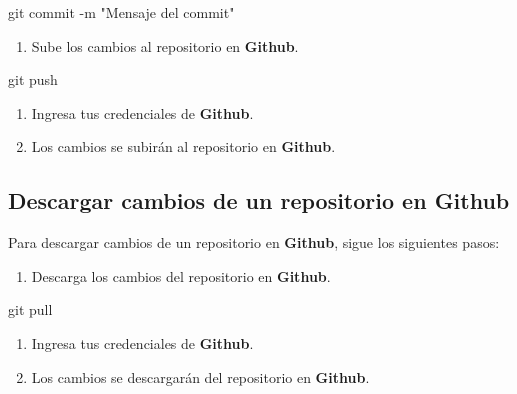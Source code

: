 \documentclass[
  a4paper,
  DIV=11,
  numbers=noendperiod,
  onepage,
  openany]{scrreprt}
\newenvironment{Shaded}{\begin{snugshade}}{\end{snugshade}}
\newcommand{\AttributeTok}[1]{\textcolor[rgb]{0.40,0.45,0.13}{#1}}
\newcommand{\FunctionTok}[1]{\textcolor[rgb]{0.28,0.35,0.67}{#1}}
\newcommand{\NormalTok}[1]{\textcolor[rgb]{0.00,0.23,0.31}{#1}}
\newcommand{\StringTok}[1]{\textcolor[rgb]{0.13,0.47,0.30}{#1}}
\providecommand{\tightlist}{%
  \setlength{\itemsep}{0pt}\setlength{\parskip}{0pt}}\usepackage{longtable,booktabs,array}
\begin{document}
\begin{Shaded}
\begin{Highlighting}[]
\FunctionTok{git}\NormalTok{ commit }\AttributeTok{{-}m} \StringTok{"Mensaje del commit"}
\end{Highlighting}
\end{Shaded}

\begin{enumerate}
\def\labelenumi{\arabic{enumi}.}
\setcounter{enumi}{2}
\tightlist
\item
  Sube los cambios al repositorio en \textbf{Github}.
\end{enumerate}

\begin{Shaded}
\begin{Highlighting}[]
\FunctionTok{git}\NormalTok{ push}
\end{Highlighting}
\end{Shaded}

\begin{enumerate}
\def\labelenumi{\arabic{enumi}.}
\setcounter{enumi}{3}
\item
  Ingresa tus credenciales de \textbf{Github}.
\item
  Los cambios se subirán al repositorio en \textbf{Github}.
\end{enumerate}

\subsection{Descargar cambios de un repositorio en
Github}\label{descargar-cambios-de-un-repositorio-en-github}

Para descargar cambios de un repositorio en \textbf{Github}, sigue los
siguientes pasos:

\begin{enumerate}
\def\labelenumi{\arabic{enumi}.}
\tightlist
\item
  Descarga los cambios del repositorio en \textbf{Github}.
\end{enumerate}

\begin{Shaded}
\begin{Highlighting}[]
\FunctionTok{git}\NormalTok{ pull}
\end{Highlighting}
\end{Shaded}

\begin{enumerate}
\def\labelenumi{\arabic{enumi}.}
\setcounter{enumi}{1}
\item
  Ingresa tus credenciales de \textbf{Github}.
\item
  Los cambios se descargarán del repositorio en \textbf{Github}.
\end{enumerate}
\end{document}
